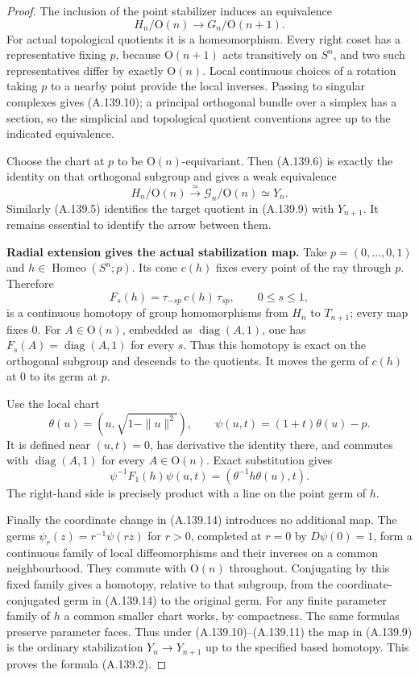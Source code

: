 \begin{proof}
The inclusion of the point stabilizer induces an equivalence
\[
 H_n/\mathrm O(n)\longrightarrow G_n/\mathrm O(n+1).
                                                               \tag{A.139.10}
\]
For actual topological quotients it is a homeomorphism. Every right
coset has a representative fixing $p$, because $\mathrm O(n+1)$
acts transitively on $S^n$, and two such representatives differ
by exactly $\mathrm O(n)$. Local continuous choices of a rotation
taking $p$ to a nearby point provide the local inverses. Passing
to singular complexes gives (A.139.10); a principal orthogonal bundle
over a simplex has a section, so the simplicial and topological
quotient conventions agree up to the indicated equivalence.

Choose the chart at $p$ to be $\mathrm O(n)$-equivariant. Then
(A.139.6) is exactly the identity on that orthogonal subgroup and
gives a weak equivalence
\[
 H_n/\mathrm O(n)\xrightarrow{\simeq}
                \mathcal G_n/\mathrm O(n)\simeq Y_n.   \tag{A.139.11}
\]
Similarly (A.139.5) identifies the target quotient in (A.139.9) with
$Y_{n+1}$. It remains essential to identify the arrow between them.

\textbf{Radial extension gives the actual stabilization map.}
Take $p=(0,\ldots,0,1)$ and $h\in\operatorname{Homeo}(S^n;p)$.
Its cone $c(h)$ fixes every point of the ray through $p$. Therefore
\[
 F_s(h)=\tau_{-sp}\,c(h)\,\tau_{sp},\qquad0\le s\le1,
                                                               \tag{A.139.12}
\]
is a continuous homotopy of group homomorphisms from $H_n$ to
$T_{n+1}$; every map fixes $0$. For $A\in\mathrm O(n)$,
embedded as $\operatorname{diag}(A,1)$, one has
$F_s(A)=\operatorname{diag}(A,1)$ for every $s$. Thus this homotopy
is exact on the orthogonal subgroup and descends to the quotients.
It moves the germ of $c(h)$ at $0$ to its germ at $p$.

Use the local chart
\[
 \theta(u)=(u,\sqrt{1-\|u\|^2}),\qquad
 \psi(u,t)=(1+t)\theta(u)-p.                            \tag{A.139.13}
\]
It is defined near $(u,t)=0$, has derivative the identity there,
and commutes with $\operatorname{diag}(A,1)$ for every
$A\in\mathrm O(n)$. Exact substitution gives
\[
 \psi^{-1}F_1(h)\psi(u,t)
                    =(\theta^{-1}h\theta(u),t).       \tag{A.139.14}
\]
The right-hand side is precisely product with a line on the
point germ of $h$.

Finally the coordinate change in (A.139.14) introduces no additional
map. The germs $\psi_r(z)=r^{-1}\psi(rz)$ for $r>0$, completed
at $r=0$ by $D\psi(0)=1$, form a continuous family of local
diffeomorphisms and their inverses on a common neighbourhood.
They commute with $\mathrm O(n)$ throughout. Conjugating by this
fixed family gives a homotopy, relative to that subgroup, from
the coordinate-conjugated germ in (A.139.14) to the original germ.
For any finite parameter family of $h$ a common smaller chart
works, by compactness. The same formulas preserve parameter faces.
Thus under (A.139.10)--(A.139.11) the map in (A.139.9) is the ordinary stabilization
$Y_n\to Y_{n+1}$ up to the specified based homotopy. This proves
the formula (A.139.2).


\end{proof}
